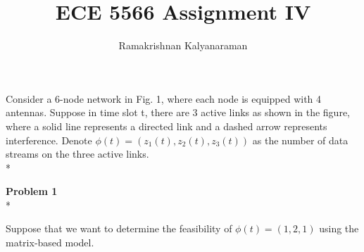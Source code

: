 \documentclass[a4paper,oneside,10pt]{report}
\begin{document}
\pagestyle{empty} %



\title{ECE 5566 Assignment IV}
\author{Ramakrishnan Kalyanaraman}
\maketitle

Consider a 6-node network in Fig. 1, where each node is equipped with 4 antennas. Suppose in time slot t, there are 3 active links as shown in the figure, where a solid line represents a directed link and a dashed arrow represents interference. Denote $\phi(t)=(z_1 (t),z_2 (t),z_3 (t))$ as the number of data streams on the three active links.	\\*

\textbf{Problem 1}	\\*

Suppose that we want to determine the feasibility of $\phi(t)=(1,2,1)$ using the matrix-based model.
\end{document}
